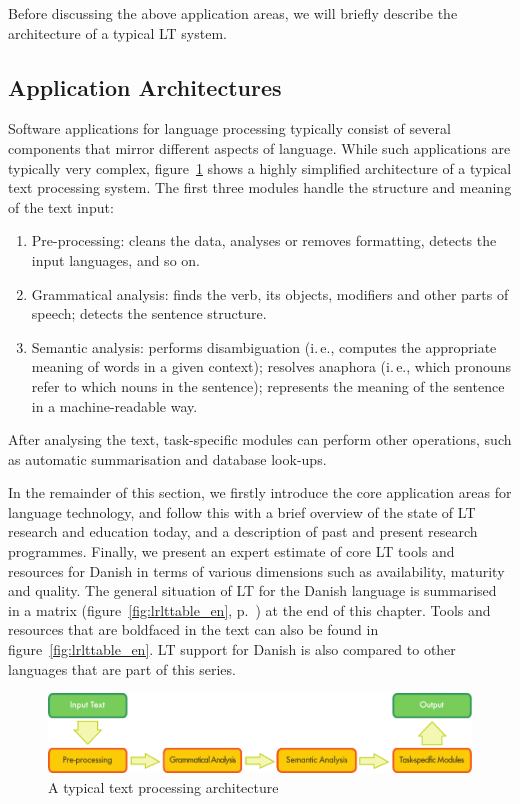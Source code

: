 \documentclass[]{../../metanetpaper}
\begin{document}
\begin{multicols}{2}
Before discussing the above application areas, we will briefly describe the architecture of a typical LT system.

\subsection{Application Architectures}

Software applications for language processing typically consist of several components that mirror different aspects of language. While such applications are typically very complex, figure~\ref{fig:textprocessingarch_en} shows a highly simplified architecture of a typical text processing system. The first three modules handle the structure and meaning of the text input:

\begin{enumerate}
\item Pre-processing: cleans the data, analyses or removes formatting, detects the input languages, and so on.
\item Grammatical analysis: finds the verb, its objects, modifiers and other parts of speech; detects the sentence structure.
\item Semantic analysis: performs disambiguation (i.\,e., computes the appropriate meaning of words in a given context); resolves anaphora (i.\,e., which pronouns refer to which nouns in the sentence); represents the meaning of the sentence in a machine-readable way.
\end{enumerate}

After analysing the text, task-specific modules can perform other operations, such as automatic summarisation and database look-ups.

In the remainder of this section, we firstly introduce the core application areas for language technology, and follow this with a brief overview of the state of LT research and education today, and a description of past and present research programmes. Finally, we present an expert estimate of core LT tools and resources for Danish in terms of various dimensions such as availability, maturity and quality. The general situation of LT for the Danish language is summarised in a matrix (figure~\ref{fig:lrlttable_en}, p.~\pageref{fig:lrlttable_en}) at the end of this chapter. Tools and resources that are boldfaced in the text can also be found in figure~\ref{fig:lrlttable_en}. LT support for Danish is also compared to other languages that are part of this series.

\begin{figure}[htb]
  \center
  \includegraphics[width=\textwidth]{../_media/english/text_processing_app_architecture}
  \caption{A typical text processing architecture}
  \label{fig:textprocessingarch_en}
\end{figure}


\end{multicols}
\end{document}
